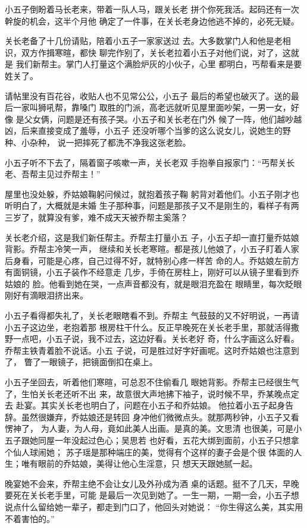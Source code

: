 小五子倒盼着马长老来，带着一队人马，跟关长老
拼个你死我活。起码还有一次幹旋的机会，这半个月他
确定了一件事，在关长老身边他逃不掉的，必死无疑。

关长老备了十几份请贴，陪着小五子一家家送过
去。大多数掌门人和他是老相识，双方作揖寒暄，都快
聊完作别了，关长老拉着小五子对他们说，对了，这就是
我们新帮主。掌门人打量这个满脸炉灰的小伙子，心里
都明白，丐帮看来是要姓关了。

请帖里没有百花谷，收贴人也不见常公公，小五子
最后的希望也破灭了。送的最后一家叫狮吼帮，靠嗓门
取胜的门派，高老远就听见屋里面吵架，一男一女，好像
是父女俩，问题是还有孩子哭。小五子和关长老在门外
候了一阵，他们越吵越凶，后来直接变成了羞辱，小五子
还没听哪个当爹的这么说女儿，说她生的野种、小杂种，
说一把摔死了都洗不净我这张老脸。

小五子听不下去了，隔着窗子咳嗽一声，关长老双
手抱拳自报家门：“丐帮关长老、吾帮主见过乔帮主！”

屋里也没处躲，乔姑娘鞠躬问候过，就抱着孩子鞠
躬背对着他们。小五子刚才也听明白了，大概就是未婚
生子那种事，问题是那孩子又不是刚生的，看样子有两
三岁了，就算没有爹，难不成天天被乔帮主奚落？

关长老介绍，这是我们新任帮主。乔帮主打量小五
子，小五子却一直打量乔姑娘背影。乔帮主冷笑一声，
继续和关长老寒暄。都是孩儿他娘了，小五子盯着人家
后身看，可能是心疼，自己过得不好，就特别心疼一样苦
命的人。乔姑娘左前方有面铜镜，小五子装作不经意走
几步，手倚在房柱上，刚好可以从镜子里看到乔姑娘的
脸。他看到她在哭，一点声音都没有，就是眼泪充盈在
眼睛里，每次眨眼刚好有滴眼泪挤出来。

小五子看得都失礼了，关长老眼瞎看不到。乔帮主
气鼓鼓的又不好明说，一再请小五子这边坐，老抱着那
根房柱干什么。反正早晚死在关长老手里，那就活得撒
野一点吧，小五子说，我不过去，这边好看。关长老好
奇，什么字画这么好看。乔帮主铁青着脸不说话。小五
子说，可是胜过好字好画呢。这时乔姑娘也注意到了，
瞥了一眼镜子，把镜面倒扣在桌上。

小五子坐回去，听着他们寒暄，可总忍不住偷看几
眼她背影。乔帮主已经很生气了，生怕关长老还听不出
来，故意很大声地拂下袖子，说时候不早，乔某晚点定去
赴宴。其实关长老也明白了，问题在小五子和乔姑娘。
他拉着小五子起身告辞。虽然很嫌弃，乔姑娘还是转回
身冲他们微微点头。就那两秒钟，小五子又看愣神了，
为人妻，为人母，竟如此美人出画。是真的美。文思清
也很美，可是小五子跟她同屋一年没起过色心；吴思若
也好看，五花大绑到面前，小五子只想拿个仙人球闹她；
苏子瑶是那种端庄的美，觉得有个这样的妻子会是个很
体面的人生；唯有眼前的乔姑娘，美得让他心生淫意，只
想天天跟她腻一起。

晚宴她不会来，乔帮主绝不会让女儿及外孙成为酒
桌的话题。挺不了几天，早晚要死在关长老手里，可能
是最后一次见到她了。一生一期，一期一会，小五子想
说点什么留给她一辈子，都走到门口了，他回头对她说：
“你生得这么美，其实用不着害怕的。”

